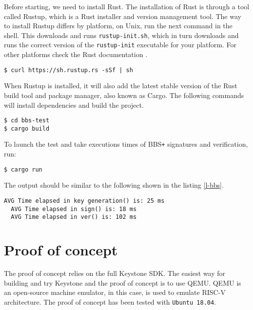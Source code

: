 Before starting, we need to install Rust. The installation of Rust is through a tool called Rustup, which is a Rust installer and version management tool. The way to install Rustup differs by platform, on Unix, run the next command in the shell. This downloads and runs \texttt{rustup-init.sh}, which in turn downloads and runs the correct version of the \texttt{rustup-init} executable for your platform. For other platforms check the Rust documentation \cite{rust-install}. \\
\begin{lstlisting}[frame=single]
$ curl https://sh.rustup.rs -sSf | sh
\end{lstlisting}
When Rustup is installed, it will also add the latest stable version of the Rust build tool and package manager, also known as Cargo. The following commands will install dependencies and build the project. \\
\begin{lstlisting}[frame=single]
$ cd bbs-test
$ cargo build
\end{lstlisting}
To launch the test and take executions times of BBS\texttt{+} signatures and verification, run:  \\
\begin{lstlisting}[frame=single]
$ cargo run
\end{lstlisting}
The output should be similar to the following shown in the listing \ref{l-bbs}. \\
\begin{lstlisting}[caption={Example of BBS\texttt{+} tests output},captionpos=b,label={l-bbs},style=DOS,frame=single]
  AVG Time elapsed in key generation() is: 25 ms
  AVG Time elapsed in sign() is: 18 ms
  AVG Time elapsed in ver() is: 102 ms
\end{lstlisting}

\section{Proof of concept}

The proof of concept relies on the full Keystone SDK. The easiest way for building and try Keystone and the proof of concept is to use QEMU. QEMU is an open-source machine emulator, in this case, is used to emulate RISC-V architecture.
The proof of concept has been tested with \texttt{Ubuntu 18.04}. 

